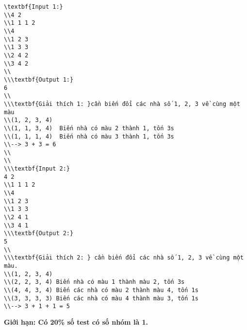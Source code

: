 \begin{verbatim}
\textbf{Input 1:}
\\4 2 
\\1 1 1 2
\\4
\\1 2 3
\\1 3 3
\\2 4 2
\\3 4 2
\\
\\\textbf{Output 1:}
6
\\
\\\textbf{Giải thích 1: }cần biến đổi các nhà số 1, 2, 3 về cùng một màu
\\(1, 2, 3, 4)
\\(1, 1, 3, 4)  Biến nhà có màu 2 thành 1, tốn 3s
\\(1, 1, 1, 4)  Biến nhà có màu 3 thành 1, tốn 3s
\\--> 3 + 3 = 6
\\
\\
\\\textbf{Input 2:}
4 2 
\\1 1 1 2
\\4
\\1 2 3
\\1 3 3
\\2 4 1
\\3 4 1
\\\textbf{Output 2:}
5 
\\
\\\textbf{Giải thích 2: } cần biến đổi các nhà số 1, 2, 3 về cùng một màu.
\\(1, 2, 3, 4)
\\(2, 2, 3, 4) Biến nhà có màu 1 thành màu 2, tốn 3s
\\(4, 4, 3, 4) Biến các nhà có màu 2 thành màu 4, tốn 1s
\\(3, 3, 3, 3) Biến các nhà có màu 4 thành màu 3, tốn 1s
\\--> 3 + 1 + 1 = 5\end{verbatim}

\textbf{      Giới hạn:\textbf{}     Có 20\% số test có số nhóm là 1.    }